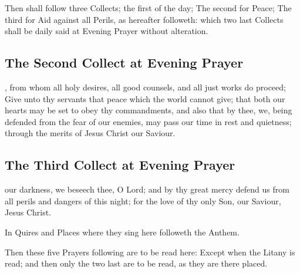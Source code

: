 \begin{rubric}
Then shall follow three Collects; the first of the day; The second for Peace; The third for Aid against all Perils, as hereafter followeth: which two last Collects shall be daily said at Evening Prayer without alteration.
\end{rubric}

\subsection{The Second Collect at Evening Prayer}

, from whom all holy desires, all good counsels, and all just works do proceed; Give unto thy servants that peace which the world cannot give; that both our hearts may be set to obey thy commandments, and also that by thee, we, being defended from the fear of our enemies, may pass our time in rest and quietness; through the merits of Jesus Christ our Saviour.

\subsection{The Third Collect at Evening Prayer}

 our darkness, we beseech thee, O Lord; and by thy great mercy defend us from all perils and dangers of this night; for the love of thy only Son, our Saviour, Jesus Christ.

\begin{rubric}
In Quires and Places where they sing here followeth the Anthem.
\end{rubric}

\begin{rubric}
Then these five Prayers following are to be read here: Except when the Litany is read; and then only the two last are to be read, as they are there placed.
\end{rubric}



\newpage



\clearpage
